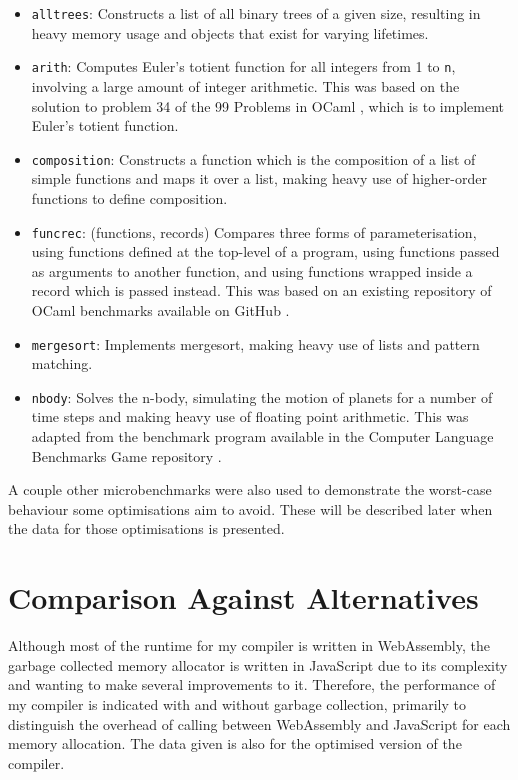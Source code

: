 \begin{itemize}
\item \verb|alltrees|: Constructs a list of all binary trees of a given size, resulting in heavy memory usage and objects that exist for varying lifetimes.

\item \verb|arith|: Computes Euler's totient function for all integers from 1 to \verb|n|, involving a large amount of integer arithmetic. This was based on the solution to problem 34 of the 99 Problems in OCaml \nocite{99-problems}, which is to implement Euler's totient function.

\item \verb|composition|: Constructs a function which is the composition of a list of simple functions and maps it over a list, making heavy use of higher-order functions to define composition.

\item \verb|funcrec|: (functions, records) Compares three forms of parameterisation, using functions defined at the top-level of a program, using functions passed as arguments to another function, and using functions wrapped inside a record which is passed instead. This was based on an existing repository of OCaml benchmarks available on GitHub \nocite{chris00}.

\item \verb|mergesort|: Implements mergesort, making heavy use of lists and pattern matching.

\item \verb|nbody|: Solves the n-body, simulating the motion of planets for a number of time steps and making heavy use of floating point arithmetic. This was adapted from the benchmark program available in the Computer Language Benchmarks Game repository \nocite{benchmark-game}.
\end{itemize}

A couple other microbenchmarks were also used to demonstrate the worst-case behaviour some optimisations aim to avoid. These will be described later when the data for those optimisations is presented. 


\section{Comparison Against Alternatives}
Although most of the runtime for my compiler is written in WebAssembly, the garbage collected memory allocator is written in JavaScript due to its complexity and wanting to make several improvements to it. Therefore, the performance of my compiler is indicated with and without garbage collection, primarily to distinguish the overhead of calling between WebAssembly and JavaScript for each memory allocation. The data given is also for the optimised version of the compiler.

